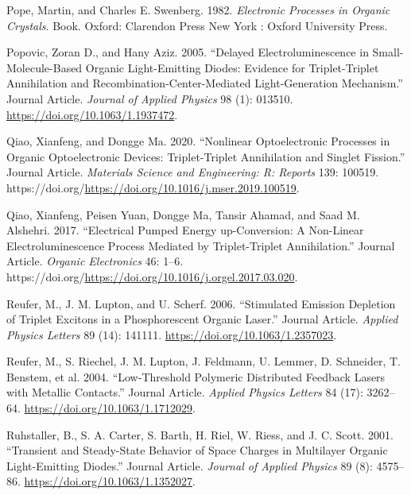 \documentclass[
  letterpaper,
  DIV=11,
  numbers=noendperiod,
  oneside]{scrreprt}
\newlength{\cslhangindent}
\newlength{\cslentryspacingunit} %
\newenvironment{CSLReferences}[2] %
 {%
  \setlength{\parindent}{0pt}
  \ifodd #1
  \let\oldpar\par
  \def\par{\hangindent=\cslhangindent\oldpar}
  \fi
  \setlength{\parskip}{#2\cslentryspacingunit}
 }%
 {}
\begin{document}
\begin{CSLReferences}{1}{0}
\leavevmode{}%
Pope, Martin, and Charles E. Swenberg. 1982. \emph{Electronic Processes
in Organic Crystals}. Book. Oxford: Clarendon Press New York : Oxford
University Press.

\leavevmode{}%
Popovic, Zoran D., and Hany Aziz. 2005. {``Delayed Electroluminescence
in Small-Molecule-Based Organic Light-Emitting Diodes: Evidence for
Triplet-Triplet Annihilation and Recombination-Center-Mediated
Light-Generation Mechanism.''} Journal Article. \emph{Journal of Applied
Physics} 98 (1): 013510. \url{https://doi.org/10.1063/1.1937472}.

\leavevmode{}%
Qiao, Xianfeng, and Dongge Ma. 2020. {``Nonlinear Optoelectronic
Processes in Organic Optoelectronic Devices: Triplet-Triplet
Annihilation and Singlet Fission.''} Journal Article. \emph{Materials
Science and Engineering: R: Reports} 139: 100519.
https://doi.org/\url{https://doi.org/10.1016/j.mser.2019.100519}.

\leavevmode{}%
Qiao, Xianfeng, Peisen Yuan, Dongge Ma, Tansir Ahamad, and Saad M.
Alshehri. 2017. {``Electrical Pumped Energy up-Conversion: A Non-Linear
Electroluminescence Process Mediated by Triplet-Triplet Annihilation.''}
Journal Article. \emph{Organic Electronics} 46: 1--6.
https://doi.org/\url{https://doi.org/10.1016/j.orgel.2017.03.020}.

\leavevmode{}%
Reufer, M., J. M. Lupton, and U. Scherf. 2006. {``Stimulated Emission
Depletion of Triplet Excitons in a Phosphorescent Organic Laser.''}
Journal Article. \emph{Applied Physics Letters} 89 (14): 141111.
\url{https://doi.org/10.1063/1.2357023}.

\leavevmode{}%
Reufer, M., S. Riechel, J. M. Lupton, J. Feldmann, U. Lemmer, D.
Schneider, T. Benstem, et al. 2004. {``Low-Threshold Polymeric
Distributed Feedback Lasers with Metallic Contacts.''} Journal Article.
\emph{Applied Physics Letters} 84 (17): 3262--64.
\url{https://doi.org/10.1063/1.1712029}.

\leavevmode{}%
Ruhstaller, B., S. A. Carter, S. Barth, H. Riel, W. Riess, and J. C.
Scott. 2001. {``Transient and Steady-State Behavior of Space Charges in
Multilayer Organic Light-Emitting Diodes.''} Journal Article.
\emph{Journal of Applied Physics} 89 (8): 4575--86.
\url{https://doi.org/10.1063/1.1352027}.


\end{CSLReferences}
\end{document}
